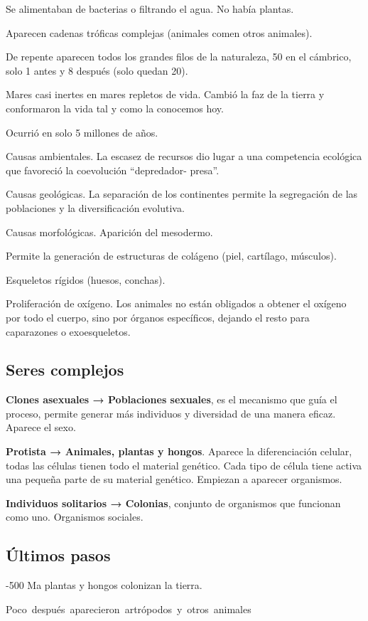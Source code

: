 \documentclass[12pt, twoside, openright]{report} %
\begin{document}
Se alimentaban de bacterias o filtrando el agua. No había plantas.

Aparecen cadenas tróficas complejas (animales comen otros animales).

De repente aparecen todos los grandes filos de la naturaleza, 50 en el cámbrico, solo 1 antes y 8 después (solo quedan 20).

Mares casi inertes en mares repletos de vida. Cambió la faz de la tierra y conformaron la vida tal y como la conocemos hoy.

Ocurrió en solo 5 millones de años.

Causas ambientales. La escasez de recursos dio lugar a una competencia ecológica que favoreció la coevolución “depredador- presa”.

Causas geológicas. La separación de los continentes permite la segregación de las poblaciones y la diversificación evolutiva.

Causas morfológicas. Aparición del mesodermo.

Permite la generación de estructuras de colágeno (piel, cartílago, músculos).

Esqueletos rígidos (huesos, conchas).

Proliferación de oxígeno. Los animales no están obligados a obtener el oxígeno por todo el cuerpo, sino por órganos específicos, dejando el resto para caparazones o exoesqueletos.

\subsection{Seres complejos}
\textbf{Clones asexuales → Poblaciones sexuales}, es el mecanismo que guía el proceso, permite generar más individuos y diversidad de una manera eficaz. Aparece el sexo.

\textbf{Protista → Animales, plantas y hongos}. Aparece la diferenciación celular, todas las células tienen todo el material genético. Cada tipo de célula tiene activa una pequeña parte de su material genético. Empiezan a aparecer organismos.

\textbf{Individuos solitarios → Colonias}, conjunto de organismos que funcionan como uno. Organismos sociales.

\subsection{Últimos pasos}
-500 Ma plantas y hongos colonizan la tierra.

Poco después aparecieron artrópodos y otros animales
\end{document}
